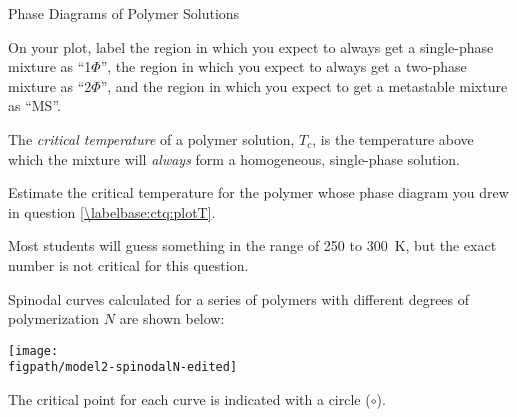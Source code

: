 \begin{activity}{Phase Diagrams of Polymer Solutions}
\begin{ctqs}
		\begin{solution}[2in]
		\end{solution}
		
	\question On your plot, label the region in which you expect to always get a single-phase mixture as ``1$\Phi$'', the region in which you expect to always get a two-phase mixture as ``2$\Phi$'', and the region in which you expect to get a metastable mixture as ``MS''.
		
		
\end{ctqs}


\begin{infobox}

	The \emph{critical temperature} of a polymer solution, $T_c$, is the temperature above which the mixture will \emph{always} form a homogeneous, single-phase solution.

\end{infobox}


\begin{ctqs}
	\question Estimate the critical temperature for the polymer whose phase diagram you drew in question \ref{\labelbase:ctq:plotT}.
	
		\begin{solution}[0.25in]
		
			Most students will guess something in the range of 250 to 300~K, but the exact number is not critical for this question.
		
		\end{solution}
		
\end{ctqs}



\begin{model}
	\label{\labelbase:mdl:Ndependence}

	Spinodal curves calculated for a series of polymers with different degrees of polymerization $N$ are shown below:
	
	\centerline{\texttt{[image: \\figpath/model2-spinodalN-edited]}}
	
	The critical point for each curve is indicated with a circle ($\circ$).
	
\end{model}

\begin{ctqs}


\end{ctqs}
\end{activity}
